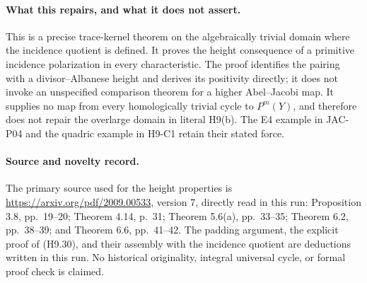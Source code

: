 \paragraph{What this repairs, and what it does not assert.}
This is a precise trace-kernel theorem on the algebraically trivial
domain where the incidence quotient is defined. It proves the height
consequence of a primitive incidence polarization in every characteristic.
The proof identifies the pairing with a divisor--Albanese height and
derives its positivity directly; it does not invoke an unspecified
comparison theorem for a higher Abel--Jacobi map. It supplies no map
from every homologically trivial cycle to $P^m(Y)$, and therefore does
not repair the overlarge domain in literal H9(b). The E4 example in
JAC-P04 and the quadric example in H9-C1 retain their stated force.

\paragraph{Source and novelty record.}
The primary source used for the height properties is
\url{https://arxiv.org/pdf/2009.00533}, version 7, directly read in this
run: Proposition 3.8, pp.~19--20; Theorem 4.14, p.~31; Theorem 5.6(a),
pp.~33--35; Theorem 6.2, pp.~38--39; and Theorem 6.6, pp.~41--42.
The padding argument, the explicit proof of (H9.30), and their assembly
with the incidence quotient are deductions written in this run. No
historical originality, integral universal cycle, or formal proof check
is claimed.
